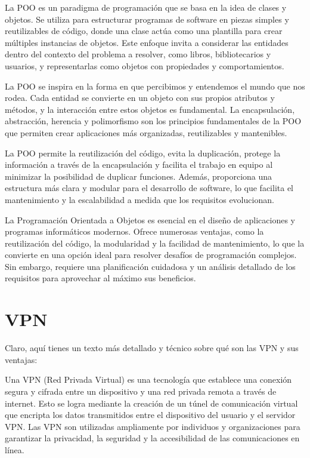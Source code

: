 La POO es un paradigma de programación que se basa en la idea de clases y objetos. Se utiliza para estructurar programas de software en piezas simples y reutilizables de código, donde una clase actúa como una plantilla para crear múltiples instancias de objetos. Este enfoque invita a considerar las entidades dentro del contexto del problema a resolver, como libros, bibliotecarios y usuarios, y representarlas como objetos con propiedades y comportamientos.

La POO se inspira en la forma en que percibimos y entendemos el mundo que nos rodea. Cada entidad se convierte en un objeto con sus propios atributos y métodos, y la interacción entre estos objetos es fundamental. La encapsulación, abstracción, herencia y polimorfismo son los principios fundamentales de la POO que permiten crear aplicaciones más organizadas, reutilizables y mantenibles.

La POO permite la reutilización del código, evita la duplicación, protege la información a través de la encapsulación y facilita el trabajo en equipo al minimizar la posibilidad de duplicar funciones. Además, proporciona una estructura más clara y modular para el desarrollo de software, lo que facilita el mantenimiento y la escalabilidad a medida que los requisitos evolucionan.

La Programación Orientada a Objetos es esencial en el diseño de aplicaciones y programas informáticos modernos. Ofrece numerosas ventajas, como la reutilización del código, la modularidad y la facilidad de mantenimiento, lo que la convierte en una opción ideal para resolver desafíos de programación complejos. Sin embargo, requiere una planificación cuidadosa y un análisis detallado de los requisitos para aprovechar al máximo sus beneficios.

\section{VPN}
\label{sec:vpn}
Claro, aquí tienes un texto más detallado y técnico sobre qué son las VPN y sus ventajas:

Una VPN (Red Privada Virtual) es una tecnología que establece una conexión segura y cifrada entre un dispositivo y una red privada remota a través de internet. Esto se logra mediante la creación de un túnel de comunicación virtual que encripta los datos transmitidos entre el dispositivo del usuario y el servidor VPN. Las VPN son utilizadas ampliamente por individuos y organizaciones para garantizar la privacidad, la seguridad y la accesibilidad de las comunicaciones en línea.

